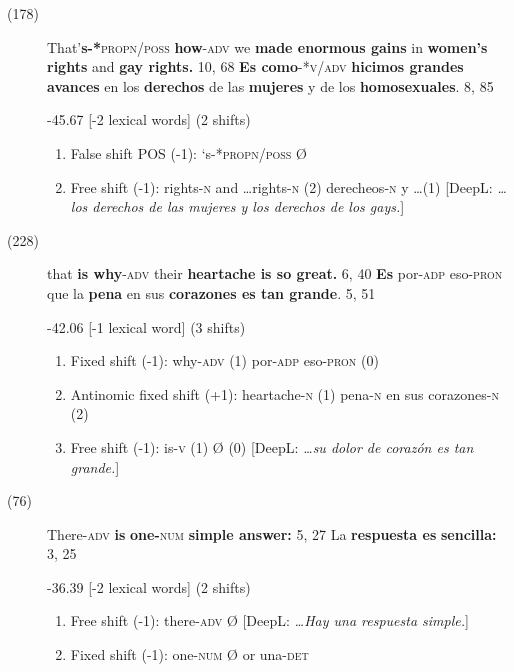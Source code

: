 \documentclass[output=paper]{langsci/langscibook}
\begin{document}
\begin{description}
  \item[(178)] That'\textbf{s-*}\textsc{propn/poss}\textbf{ how}-\textsc{adv} we \textbf{made enormous gains} in \textbf{women’s rights} and \textbf{gay rights.} 10, 68 \rightarrow \textbf{Es como}-*\textsc{v/adv} \textbf{hicimos grandes avances} en los \textbf{derechos} de las \textbf{mujeres} y de los \textbf{homosexuales}. 8, 85

    -45.67 [-2 lexical words] (2 shifts)

    \begin{enumerate}
      \item False shift POS (-1): ‘s-*\textsc{propn/poss} \rightarrow Ø
      \item Free shift (-1): rights-\textsc{n} and \dots rights-\textsc{n} (2) \rightarrow derecheos-\textsc{n} y \dots (1) [DeepL: \textit{\dots los derechos de las mujeres y los derechos de los gays.}]
    \end{enumerate}

  \item[(228)] that \textbf{is why}-\textsc{adv} their \textbf{heartache is so great.} 6, 40 \rightarrow \textbf{Es} por\textsc{-adp} eso\textsc{-pron} que la \textbf{pena} en sus \textbf{corazones es tan grande}. 5, 51

    -42.06 [-1 lexical word] (3 shifts)

    \begin{enumerate}
      \item Fixed shift (-1): why-\textsc{adv} (1) \rightarrow por\textsc{-adp} eso\textsc{-pron} (0)
      \item Antinomic fixed shift (+1): heartache-\textsc{n} (1) \rightarrow pena-\textsc{n} en sus cora\-zo\-nes-\textsc{n} (2)
      \item Free shift (-1): is-\textsc{v} (1) \rightarrow Ø (0) [DeepL: \textit{\dots su dolor de corazón es tan grande.}]
    \end{enumerate}

  \item[(76)] There-\textsc{adv} \textbf{is} \textbf{one-}\textsc{num} \textbf{simple answer:} 5, 27 \rightarrow La \textbf{respuesta es} \textbf{sencilla:} 3, 25

    -36.39 [-2 lexical words] (2 shifts)

    \begin{enumerate}
      \item Free shift (-1): there-\textsc{adv} \rightarrow Ø [DeepL: \textit{\dots Hay una respuesta simple.}]
      \item Fixed shift (-1): one-\textsc{num} \rightarrow Ø or una-\textsc{det}
    \end{enumerate}


\end{description}
\end{document}
